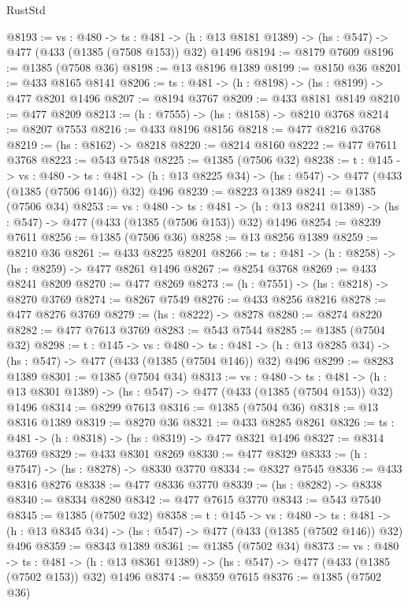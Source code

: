 \begin{lexlean}{RustStd}
\begin{coremodule}
@8193 := {vs : @480} ->
  {ts : @481} -> (h : @13 @8181 @1389) -> (hs : @547) -> @477 (@433 (@1385 (@7508 @153)) @32) @1496
@8194 := @8179 @7609
@8196 := @1385 (@7508 @36)
@8198 := @13 @8196 @1389
@8199 := @8150 @36
@8201 := @433 @8165 @8141
@8206 := {ts : @481} -> (h : @8198) -> (hs : @8199) -> @477 @8201 @1496
@8207 := @8194 @3767
@8209 := @433 @8181 @8149
@8210 := @477 @8209
@8213 := (h : @7555) -> (hs : @8158) -> @8210 @3768
@8214 := @8207 @7553
@8216 := @433 @8196 @8156
@8218 := @477 @8216 @3768
@8219 := (hs : @8162) -> @8218
@8220 := @8214 @8160
@8222 := @477 @7611 @3768
@8223 := @543 @7548
@8225 := @1385 (@7506 @32)
@8238 := {t : @145} ->
  {vs : @480} ->
  {ts : @481} -> (h : @13 @8225 @34) -> (hs : @547) -> @477 (@433 (@1385 (@7506 @146)) @32) @496
@8239 := @8223 @1389
@8241 := @1385 (@7506 @34)
@8253 := {vs : @480} ->
  {ts : @481} -> (h : @13 @8241 @1389) -> (hs : @547) -> @477 (@433 (@1385 (@7506 @153)) @32) @1496
@8254 := @8239 @7611
@8256 := @1385 (@7506 @36)
@8258 := @13 @8256 @1389
@8259 := @8210 @36
@8261 := @433 @8225 @8201
@8266 := {ts : @481} -> (h : @8258) -> (hs : @8259) -> @477 @8261 @1496
@8267 := @8254 @3768
@8269 := @433 @8241 @8209
@8270 := @477 @8269
@8273 := (h : @7551) -> (hs : @8218) -> @8270 @3769
@8274 := @8267 @7549
@8276 := @433 @8256 @8216
@8278 := @477 @8276 @3769
@8279 := (hs : @8222) -> @8278
@8280 := @8274 @8220
@8282 := @477 @7613 @3769
@8283 := @543 @7544
@8285 := @1385 (@7504 @32)
@8298 := {t : @145} ->
  {vs : @480} ->
  {ts : @481} -> (h : @13 @8285 @34) -> (hs : @547) -> @477 (@433 (@1385 (@7504 @146)) @32) @496
@8299 := @8283 @1389
@8301 := @1385 (@7504 @34)
@8313 := {vs : @480} ->
  {ts : @481} -> (h : @13 @8301 @1389) -> (hs : @547) -> @477 (@433 (@1385 (@7504 @153)) @32) @1496
@8314 := @8299 @7613
@8316 := @1385 (@7504 @36)
@8318 := @13 @8316 @1389
@8319 := @8270 @36
@8321 := @433 @8285 @8261
@8326 := {ts : @481} -> (h : @8318) -> (hs : @8319) -> @477 @8321 @1496
@8327 := @8314 @3769
@8329 := @433 @8301 @8269
@8330 := @477 @8329
@8333 := (h : @7547) -> (hs : @8278) -> @8330 @3770
@8334 := @8327 @7545
@8336 := @433 @8316 @8276
@8338 := @477 @8336 @3770
@8339 := (hs : @8282) -> @8338
@8340 := @8334 @8280
@8342 := @477 @7615 @3770
@8343 := @543 @7540
@8345 := @1385 (@7502 @32)
@8358 := {t : @145} ->
  {vs : @480} ->
  {ts : @481} -> (h : @13 @8345 @34) -> (hs : @547) -> @477 (@433 (@1385 (@7502 @146)) @32) @496
@8359 := @8343 @1389
@8361 := @1385 (@7502 @34)
@8373 := {vs : @480} ->
  {ts : @481} -> (h : @13 @8361 @1389) -> (hs : @547) -> @477 (@433 (@1385 (@7502 @153)) @32) @1496
@8374 := @8359 @7615
@8376 := @1385 (@7502 @36)

\end{coremodule}
\end{lexlean}
